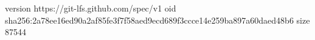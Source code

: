 version https://git-lfs.github.com/spec/v1
oid sha256:2a78ee16ed90a2af85fe3f7f58aed9ecd689f3ccce14e259ba897a60daed48b6
size 87544
